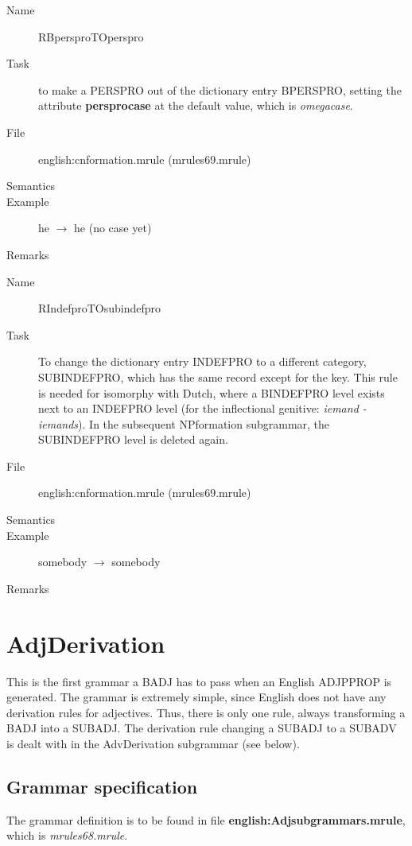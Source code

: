 \vspace{1 cm}
\begin{description}
\item[Name] RBpersproTOperspro
\item[Task] to make a PERSPRO out of the dictionary entry BPERSPRO, setting the 
attribute {\bf persprocase} at the default value, which is {\em omegacase\/}.
\item[File] english:cnformation.mrule (mrules69.mrule)
\item[Semantics]
\item[Example] he $\rightarrow$ he (no case yet)
\item[Remarks]
\end{description}

\vspace{1 cm}
\begin{description}
\item[Name] RIndefproTOsubindefpro
\item[Task] To change the dictionary entry INDEFPRO to a different 
category, SUBINDEFPRO, which has the same record except for the key. This rule
is needed for isomorphy with Dutch, where a BINDEFPRO level exists next to an 
INDEFPRO level (for the inflectional genitive: {\em iemand - iemands\/}). In 
the subsequent NPformation subgrammar, the SUBINDEFPRO level is deleted again.
\item[File] english:cnformation.mrule (mrules69.mrule)
\item[Semantics]
\item[Example] somebody $\rightarrow$ somebody
\item[Remarks]
\end{description}

\newpage
\section{AdjDerivation}
This is the first grammar a BADJ has to pass when an English ADJPPROP is 
generated. The grammar is extremely simple, since English does not have any 
derivation rules for adjectives. Thus, there is only one rule, always 
transforming a BADJ into a SUBADJ. The derivation rule changing a SUBADJ to a 
SUBADV is dealt with in the AdvDerivation subgrammar (see below).

\subsection{Grammar specification}
The grammar definition is to be found in file {\bf 
english:Adjsubgrammars.mrule}, which 
is {\em mrules68.mrule\/}.

